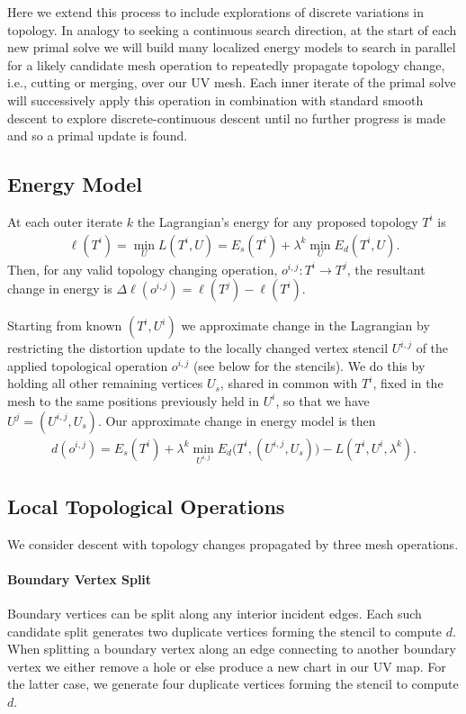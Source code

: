 Here we extend this process to include explorations of discrete variations in topology. In analogy to seeking a continuous search direction, at the start of each new primal solve we will build many localized energy models to search in parallel for a likely candidate mesh operation to repeatedly propagate topology change, i.e., cutting or merging, over our UV mesh. Each inner iterate of the primal solve will successively apply this operation in combination with standard smooth descent to explore discrete-continuous descent until no further progress is made and so a primal update is found.    

\subsection{Energy Model}

At each outer iterate $k$ the Lagrangian's energy for any proposed topology $T^i$ is  
\begin{align}
\ell(T^i) = \min_{U} L(T^i, U) = E_s(T^i) + \lambda^k \min_{U} E_d(T^i, U).
\end{align}
Then, for any valid topology changing operation, $o^{i,j}:T^i \rightarrow T^j$, the resultant change in energy is $\Delta \ell(o^{i,j}) = \ell(T^j) - \ell(T^i)$.

Starting from known $(T^i, U^i)$ we approximate change in the Lagrangian by restricting the distortion update to the locally changed vertex stencil $U^{i,j}$ of the applied topological operation $o^{i,j}$ (see below for the stencils). 
We do this by holding all other remaining vertices $U_s$, shared in common with $T^i$, fixed in the mesh
to the same positions previously held in $U^i$, so that we have $U^j = (U^{i,j}, U_s)$.  Our approximate change in energy model is then 
\begin{align} 
d(o^{i,j}) = E_s(T^i) + \lambda^k \min_{U^{i,j}} E_d \big( T^i, (U^{i,j}, U_s) \big) - L(T^i,U^i,\lambda^k).
\end{align}

\subsection{Local Topological Operations}

We consider descent with topology changes propagated by three mesh operations.

\paragraph{Boundary Vertex Split}
Boundary vertices can be split along any interior incident edges. Each such candidate split generates two duplicate vertices forming the stencil to compute $d$.
When splitting a boundary vertex along an edge connecting to another boundary vertex we either remove a hole or else produce a new chart in our UV map. For the latter case, we generate four duplicate vertices forming the stencil to compute $d$.

